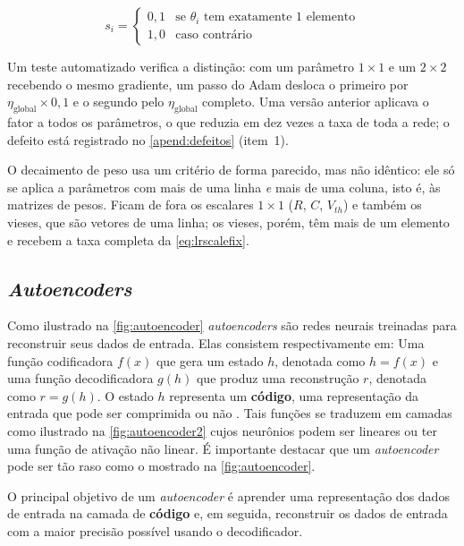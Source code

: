 				\begin{equation}
					\label{eq:lrscalefix}
					s_i = \begin{cases} 0{,}1 & \text{se } \theta_i \text{ tem exatamente 1 elemento} \\ 1{,}0 & \text{caso contrário} \end{cases}
				\end{equation}

				\par Um teste automatizado verifica a distinção: com um parâmetro $1\times1$ e um $2\times2$ recebendo o mesmo gradiente, um passo do Adam desloca o primeiro por $\eta_{\text{global}}\times0{,}1$ e o segundo pelo $\eta_{\text{global}}$ completo. Uma versão anterior aplicava o fator a todos os parâmetros, o que reduzia em dez vezes a taxa de toda a rede; o defeito está registrado no \autoref{apend:defeitos} (item~1).

				\par O decaimento de peso usa um critério de forma parecido, mas não idêntico: ele só se aplica a parâmetros com mais de uma linha \emph{e} mais de uma coluna, isto é, às matrizes de pesos. Ficam de fora os escalares $1\times1$ ($R$, $C$, $V_{th}$) e também os vieses, que são vetores de uma linha; os vieses, porém, têm mais de um elemento e recebem a taxa completa da \autoref{eq:lrscalefix}.

		\subsection{\textit{Autoencoders}}
		
			\par Como ilustrado na  \autoref{fig:autoencoder} \textit{autoencoders} são redes neurais treinadas para reconstruir seus dados de entrada. Elas consistem respectivamente em: Uma função codificadora $f(x)$ que gera um estado $h$, denotada como $h = f(x)$ e uma função decodificadora $g(h)$ que produz uma reconstrução $r$, denotada como $r = g(h)$. O estado $h$ representa um \textbf{código}, uma representação da entrada que pode ser comprimida ou não  \cite{Goodfellow-et-al-2016}. Tais funções se traduzem em camadas como ilustrado na  \autoref{fig:autoencoder2} cujos neurônios podem ser lineares ou ter uma função de ativação não linear. É importante destacar que um \textit{autoencoder} pode ser tão raso como o mostrado na \autoref{fig:autoencoder}.
			
			\par O principal objetivo de um \textit{autoencoder} é aprender uma representação dos dados de entrada na camada de \textbf{código} e, em seguida, reconstruir os dados de entrada com a maior precisão possível usando o decodificador.

